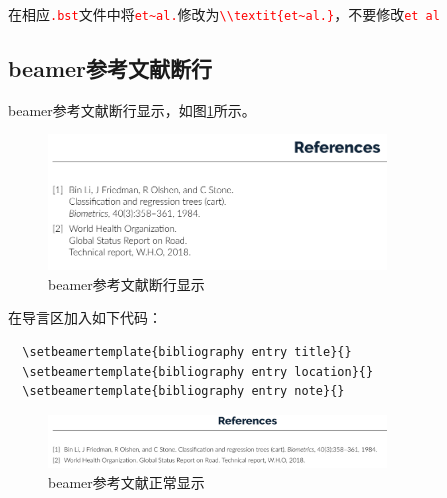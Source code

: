 在相应\textcolor{red}{\lstinline|.bst|}文件中将\textcolor{red}{\lstinline{et~al.}}修改为\textcolor{red}{\lstinline|\\textit{et~al.}|}，不要修改\textcolor{red}{\lstinline{et al}}

\subsection{beamer参考文献断行}\label{subsec:beamer-ref-break}
beamer参考文献断行显示，如图\ref{fig:beamer-ref}所示。
\begin{figure}[!h]
  \centering
  \includegraphics[width=0.8\textwidth]{figure/chap-ref/cankaowenxianduanhang.png}
  \caption{beamer参考文献断行显示}
  \label{fig:beamer-ref}
\end{figure}

在导言区加入如下代码：
\begin{lstlisting}
  \setbeamertemplate{bibliography entry title}{}
  \setbeamertemplate{bibliography entry location}{}
  \setbeamertemplate{bibliography entry note}{}
\end{lstlisting}
\begin{figure}[!h]
  \centering
  \includegraphics[width=0.8\textwidth]{figure/chap-ref/cankaowenxianduanhang1.png}
  \caption{beamer参考文献正常显示}
  \label{fig:beamer-ref1}
\end{figure}